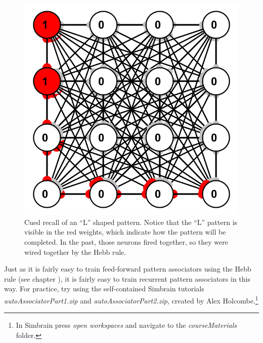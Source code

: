 \begin{figure}[h]
\centering
\includegraphics[scale=.45]{./images/patternCompletion_Cue}
\caption[Simbrain screenshot.]{Cued recall of an ``L'' shaped pattern. Notice that the ``L'' pattern is visible in the red weights, which indicate how the pattern will be completed. In the past, those neurons fired together, so they were wired together by the Hebb rule.}
\label{patternCompletionL}
\end{figure}

Just as it is fairly easy to train feed-forward pattern associators using the Hebb rule (see chapter ), it is fairly easy to train recurrent pattern associators in this way.  For practice, try using the self-contained Simbrain tutorials \emph{autoAssociatorPart1.zip} and \emph{autoAssociatorPart2.zip}, created by Alex Holcombe.\footnote{In Simbrain press \emph{open workspaces} and navigate to the \emph{courseMaterials} folder.}

